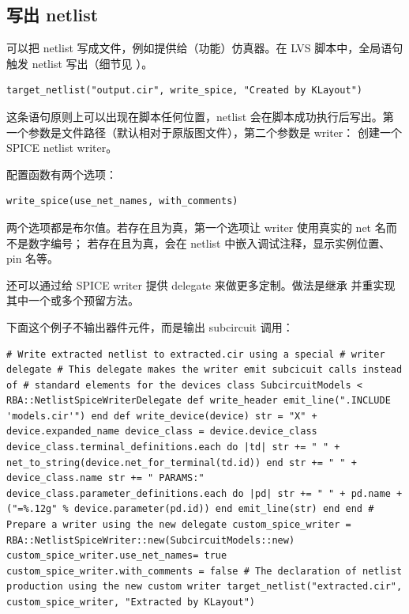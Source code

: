 \subsection{写出 netlist}

可以把 netlist 写成文件，例如提供给（功能）仿真器。在 LVS 脚本中，全局语句  触发 netlist 写出（细节见 ）。

\begin{lstlisting}
target_netlist("output.cir", write_spice, "Created by KLayout")
\end{lstlisting}

这条语句原则上可以出现在脚本任何位置，netlist 会在脚本成功执行后写出。第一个参数是文件路径（默认相对于原版图文件），第二个参数是 writer： 创建一个 SPICE netlist writer。

 配置函数有两个选项：

\begin{lstlisting}
write_spice(use_net_names, with_comments)
\end{lstlisting}

两个选项都是布尔值。若存在且为真，第一个选项让 writer 使用真实的 net 名而不是数字编号； 若存在且为真，会在 netlist 中嵌入调试注释，显示实例位置、pin 名等。

还可以通过给 SPICE writer 提供 delegate 来做更多定制。做法是继承  并重实现其中一个或多个预留方法。

下面这个例子不输出器件元件，而是输出 subcircuit 调用：

\begin{lstlisting}
# Write extracted netlist to extracted.cir using a special # writer delegate # This delegate makes the writer emit subcicuit calls instead of # standard elements for the devices class SubcircuitModels < RBA::NetlistSpiceWriterDelegate def write_header emit_line(".INCLUDE 'models.cir'") end def write_device(device) str = "X" + device.expanded_name device_class = device.device_class device_class.terminal_definitions.each do |td| str += " " + net_to_string(device.net_for_terminal(td.id)) end str += " " + device_class.name str += " PARAMS:" device_class.parameter_definitions.each do |pd| str += " " + pd.name + ("=%.12g" % device.parameter(pd.id)) end emit_line(str) end end # Prepare a writer using the new delegate custom_spice_writer = RBA::NetlistSpiceWriter::new(SubcircuitModels::new) custom_spice_writer.use_net_names= true custom_spice_writer.with_comments = false # The declaration of netlist production using the new custom writer target_netlist("extracted.cir", custom_spice_writer, "Extracted by KLayout")
\end{lstlisting}

